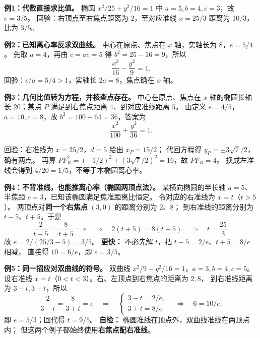 \begin{examplebox}
\textbf{例1：代数直接求比值。} 椭圆 $x^2/25+y^2/16=1$ 中
$a=5,b=4,c=3$，故 $\boxed{e=3/5}$。
回验：右顶点至右焦点距离为 $2$，至对应准线 $x=25/3$ 距离为 $10/3$，比为 $3/5$。

\medskip
\textbf{例2：已知离心率反求双曲线。}
中心在原点、焦点在 $x$ 轴，实轴长为 $8$，$e=5/4$。
先取 $a=4$，再由 $c=ae=5$ 得 $b^2=25-16=9$，所以
\[
 \boxed{\frac{x^2}{16}-\frac{y^2}{9}=1}.
\]
回验：$c/a=5/4>1$，实轴长 $2a=8$，焦点确在 $x$ 轴。

\medskip
\textbf{例3：几何比值转为方程，并核查点存在。}
中心在原点、焦点在 $x$ 轴的椭圆长轴长 $20$；某点 $P$ 满足到右焦点距离 $4$、到对应准线距离 $5$。
由定义 $e=4/5$，$a=10,c=8$，故 $b^2=100-64=36$，答案为
\[
 \boxed{\frac{x^2}{100}+\frac{y^2}{36}=1}.
\]

回验：右准线为 $x=25/2$，$d=5$ 给出 $x_P=15/2$；
代回方程得 $y_P=\pm3\sqrt7/2$，确有两点。
再算 $PF_R^2=(-1/2)^2+(3\sqrt7/2)^2=16$，故 $PF_R=4$。
换成左准线会得到 $4/20=1/5$，不等于本椭圆离心率。
\end{examplebox}
\clearpage

\begin{examplebox}
\textbf{例4：不背准线，也能推离心率（椭圆两顶点法）。}
某横向椭圆的半长轴 $a=5$、半焦距 $c=3$，已知该椭圆满足焦准距离比恒定。
令对应的右准线为 $x=t$（$t>5$）。
两顶点对\textbf{同一个右焦点} $(3,0)$ 的距离分别为 $2$、$8$；
到右准线的距离分别为 $t-5$、$t+5$。于是
\[
 \frac2{t-5}=\frac8{t+5}=e
 \quad\Longrightarrow\quad
 2(t+5)=8(t-5)
 \quad\Longrightarrow\quad t=\frac{25}{3}.
\]
故 $e=2/(25/3-5)=\boxed{3/5}$。
\textbf{更快：} 不必先解 $t$，把 $t-5=2/e$、$t+5=8/e$ 相减，
直接得 $10=6/e$，即 $e=3/5$。

\medskip
\textbf{例5：同一招应对双曲线的符号。}
双曲线 $x^2/9-y^2/16=1$，$a=3,b=4,c=5$。
设右准线 $x=t$（$0<t<3$）。右、左顶点到右焦点的距离为 $2,8$，
到右准线距离为 $3-t,3+t$，所以
\[
 \frac{2}{3-t}=\frac{8}{3+t}=e
 \quad\Longrightarrow\quad
 \begin{cases}3-t=2/e,\\ 3+t=8/e\end{cases}
 \quad\Longrightarrow\quad
 6=10/e.
\]
即 $\boxed{e=5/3}$；回代得 $t=9/5$。
\textbf{自检：} 椭圆准线在顶点外，双曲线准线在两顶点内；
但这两个例子都始终使用\textbf{右焦点配右准线}。
\end{examplebox}
\clearpage

